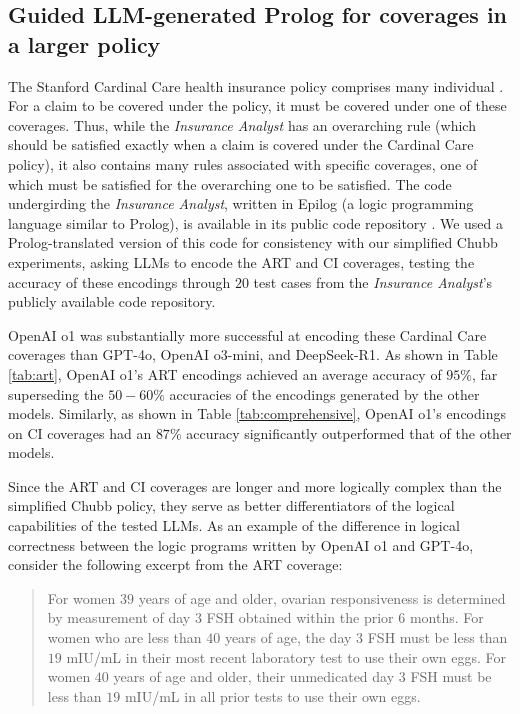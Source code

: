 \subsection{Guided LLM-generated Prolog for coverages in a larger policy}
The Stanford Cardinal Care health insurance policy comprises many individual . For a claim to be covered under the policy, it must be covered under one of these coverages. Thus, while the \textit{Insurance Analyst} has an overarching  rule (which should be satisfied exactly when a claim is covered under the Cardinal Care policy), it also contains many rules associated with specific coverages, one of which must be satisfied for the overarching one to be satisfied. The code undergirding the \textit{Insurance Analyst}, written in Epilog (a logic programming language similar to Prolog), is available in its public code repository \cite{insurance-analyst-github-2025}. We used a Prolog-translated version of this code for consistency with our simplified Chubb experiments, asking LLMs to encode the ART and CI coverages, testing the accuracy of these encodings through $20$ test cases from the \textit{Insurance Analyst}'s publicly available code repository.

OpenAI o1 was substantially more successful at encoding these Cardinal Care coverages than GPT-4o, OpenAI o3-mini, and DeepSeek-R1. As shown in Table \ref{tab:art}, OpenAI o1's ART encodings achieved an average accuracy of $95\%$, far superseding the $50-60\%$ accuracies of the encodings generated by the other models. Similarly, as shown in Table \ref{tab:comprehensive}, OpenAI o1's encodings on CI coverages had an $87\%$ accuracy significantly outperformed that of the other models.

Since the ART and CI coverages are longer and more logically complex than the simplified Chubb policy, they serve as better differentiators of the logical capabilities of the tested LLMs. As an example of the difference in logical correctness between the logic programs written by OpenAI o1 and GPT-4o, consider the following excerpt from the ART coverage:

\begin{quote}
For women $39$ years of age and older, ovarian responsiveness is determined by measurement of day $3$ FSH obtained within the prior $6$ months. For women who are less than $40$ years of age, the day $3$ FSH must be less than $19$ mIU/mL in their most recent laboratory test to use their own eggs. For women $40$ years of age and older, their unmedicated day $3$ FSH must be less than $19$ mIU/mL in all prior tests to use their own eggs.
\end{quote}

